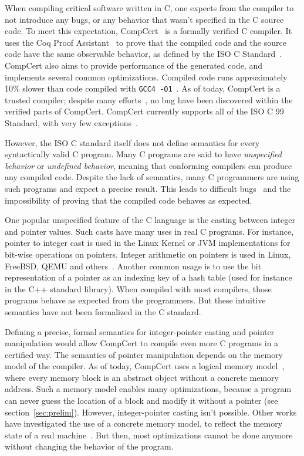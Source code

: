 When compiling critical software written in C, one expects from the compiler to not introduce any bugs, or any behavior that wasn't specified in the C source code.%
To meet this expectation, CompCert~\cite{DBLP:journals/cacm/Leroy09} is a formally verified C compiler.
It uses the Coq Proof Assistant~\cite{coq} to prove that the compiled code and the source code have the same observable behavior, as defined by the ISO C Standard~\cite{iso}.
CompCert also aims to provide performance of the generated code, and implements several common optimizations. Compiled code runs approximately 10\% slower than code compiled with \texttt{GCC4 -O1}~\cite{compcertwebsite}.
As of today, CompCert is a trusted compiler; despite many efforts~\cite{DBLP:conf/pldi/YangCER11}, no bug have been discovered within the verified parts of CompCert.
CompCert currently supports all of the ISO C 99 Standard, with very few exceptions~\cite{compcertwebsite}.

However, the ISO C standard itself does not define semantics for every syntactically valid C program.
Many C programs are said to have \textit{unspecified behavior} or \textit{undefined behavior}, meaning that conforming compilers can produce any compiled code.
Despite the lack of semantics, many C programmers are using such programs and expect a precise result. %
This leads to difficult bugs~\cite{DBLP:conf/apsys/WangCCJZK12} and the impossibility of proving that the compiled code behaves as expected.

One popular unspecified feature of the C language is the casting between integer and pointer values.
Such casts have many uses in real C programs. For instance, pointer to integer cast is used in the Linux Kernel or JVM implementations for bit-wise operations on pointers. Integer arithmetic on pointers is used in Linux, FreeBSD, QEMU and others~\cite{cerberus}. Another common usage is to use the bit representation of a pointer as an indexing key of a hash table (used for instance in the C++ standard library).
When compiled with most compilers, those programs behave as expected from the programmers. But these intuitive semantics have not been formalized in the C standard.

Defining a precise, formal semantics for integer-pointer casting and pointer manipulation would allow CompCert to compile even more C programs in a certified way.
The semantics of pointer manipulation depends on the memory model of the compiler.
As of today, CompCert uses a logical memory model~\cite{leroy:hal-00703441}, where every memory block is an abstract object without a concrete memory address. Such a memory model enables many optimizations, because a program can never guess the location of a block and modify it without a pointer (see section~\ref{sec:prelim}).
However, integer-pointer casting isn't possible.
Other works have investigated the use of a concrete memory model, to reflect the memory state of a real machine~\cite{DBLP:conf/popl/TuchKN07}\cite{Norrish98cformalised}. But then, most optimizations cannot be done anymore without changing the behavior of the program.

